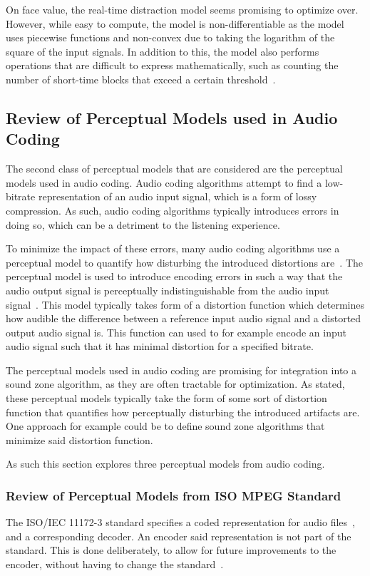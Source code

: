 On face value, the real-time distraction model seems promising to optimize over.
However, while easy to compute, the model is non-differentiable as the model uses
piecewise functions and non-convex due to taking the logarithm of the square of the input signals.
In addition to this, the model also performs operations that are difficult to express mathematically, such as counting 
the number of short-time blocks that exceed a certain threshold~\cite{ramo2017real}.

\subsection{Review of Perceptual Models used in Audio Coding}
\label{ch:perceptual:review:audio_coding}
The second class of perceptual models that are considered are the perceptual models used in audio coding.
Audio coding algorithms attempt to find a low-bitrate representation of an audio input signal, which is a 
form of lossy compression.
As such, audio coding algorithms typically introduces errors in doing so, 
which can be a detriment to the listening experience.

To minimize the impact of these errors, many audio coding algorithms use a perceptual model to quantify 
how disturbing the introduced distortions are~\cite{herre2019psychoacoustic}.
The perceptual model is used to introduce encoding errors in such a way that the audio output
signal is perceptually indistinguishable from the audio input signal~\cite{taal2012low}.
This model typically takes form of a distortion function which determines how
audible the difference between a reference input audio signal and a distorted output audio signal is.
This function can used to for example encode an input audio signal such that it has minimal distortion for a
specified bitrate.

The perceptual models used in audio coding are promising for integration into a sound zone algorithm, as they are 
often tractable for optimization.
As stated, these perceptual models typically take the form of some sort of distortion function that quantifies
how perceptually disturbing the introduced artifacts are. 
One approach for example could be to define sound zone algorithms that minimize said distortion function.

As such this section explores three perceptual models from audio coding.

\subsubsection{Review of Perceptual Models from ISO MPEG Standard}
The ISO/IEC 11172-3 standard specifies a coded representation for audio files~\cite{ISO11172-3}, 
and a corresponding decoder.
An encoder said representation is not part of the standard.
This is done deliberately, to allow for future improvements to the encoder, 
without having to change the standard~\cite{pan1995tutorial}.

